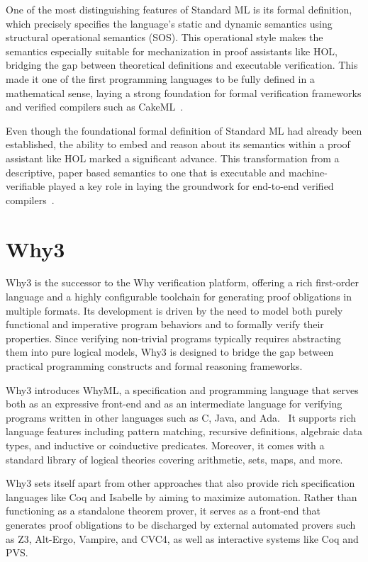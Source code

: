 One of the most distinguishing features of Standard ML is its formal definition, which precisely specifies the language's 
static and dynamic semantics using structural operational semantics (SOS). This operational style makes the semantics 
especially suitable for mechanization in proof assistants like HOL, bridging the gap between theoretical definitions 
and executable verification. This made it one of the first programming languages to be fully defined in a mathematical 
sense, laying a strong foundation for formal verification frameworks and verified compilers such as 
CakeML~\cite{milner1997definition, SewellMTKMAO23}. 

Even though the foundational formal definition of Standard ML had already been established, the ability to embed and 
reason about its semantics within a proof assistant like HOL marked a significant advance. This transformation from a 
descriptive, paper based semantics to one that is executable and machine-verifiable played a key role in laying the 
groundwork for end-to-end verified compilers~\cite{Syme93}.

\section{Why3}
\label{sec:Why3}

Why3 is the successor to the Why verification platform, offering a rich first-order language and a highly configurable 
toolchain for generating proof obligations in multiple formats. Its development is driven by the need to model both purely 
functional and imperative program behaviors and to formally verify their properties. Since verifying non-trivial programs 
typically requires abstracting them into pure logical models, Why3 is designed to bridge the gap between practical programming 
constructs and formal reasoning frameworks.

Why3 introduces \textsf{WhyML}, a specification and programming language that serves both as an expressive front-end and as 
an intermediate language for verifying programs written in other languages such as C, Java, and Ada.~\cite{FilliatreP13} 
It supports rich language features including pattern matching, recursive definitions, algebraic data types, and inductive or 
coinductive predicates. Moreover, it comes with a standard library of logical theories covering arithmetic, sets, maps, 
and more.

Why3 sets itself apart from other approaches that also provide rich specification languages like \textsf{Coq} and 
\textsf{Isabelle} by aiming to maximize automation. Rather than functioning as a standalone theorem prover, it serves 
as a front-end that generates proof obligations to be discharged by external automated provers such as Z3, Alt-Ergo, 
Vampire, and CVC4, as well as interactive systems like Coq and PVS.

